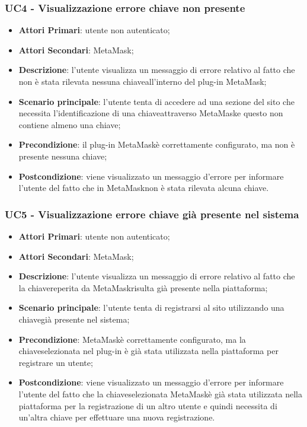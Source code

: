 \subsubsection{UC4 - Visualizzazione errore chiave non 
	presente}
\begin{itemize}
	\item \textbf{Attori Primari}: utente non autenticato;
	\item \textbf{Attori Secondari}: MetaMask\glo;
	\item \textbf{Descrizione}:
	l'utente visualizza un messaggio di errore relativo al fatto che non è stata rilevata nessuna chiave\glosp all'interno del plug-in MetaMask\glo;
	\item \textbf{Scenario principale}: l'utente tenta di accedere ad una sezione del sito che necessita l'identificazione di una chiave\glosp attraverso MetaMask\glo e questo non contiene almeno una chiave\glo;
	\item \textbf{Precondizione}: il plug-in MetaMask\glosp è correttamente configurato, ma non è presente nessuna chiave\glo;
	\item \textbf{Postcondizione}: viene visualizzato un messaggio d'errore per informare l'utente del fatto che in MetaMask\glosp non è stata rilevata alcuna chiave\glo.
	
\end{itemize}

\subsubsection{UC5 - Visualizzazione errore chiave già presente nel sistema}
\begin{itemize}
	\item \textbf{Attori Primari}: utente non autenticato;
	\item \textbf{Attori Secondari}: MetaMask\glo;
	\item \textbf{Descrizione}:
	l'utente visualizza un messaggio di errore relativo al fatto che la chiave\glosp reperita da MetaMask\glosp risulta già presente nella piattaforma;
	\item \textbf{Scenario principale}: l'utente tenta di registrarsi al sito utilizzando una chiave\glosp già presente nel sistema;
	\item \textbf{Precondizione}: MetaMask\glosp è correttamente configurato, ma la chiave\glosp selezionata nel plug-in è già stata utilizzata nella piattaforma per registrare un utente;
	\item \textbf{Postcondizione}: viene visualizzato un messaggio d'errore per informare l'utente del fatto che la chiave\glosp selezionata MetaMask\glosp è già stata utilizzata nella piattaforma per la registrazione di un altro utente e quindi necessita di un'altra chiave per effettuare una nuova registrazione.
\end{itemize}

